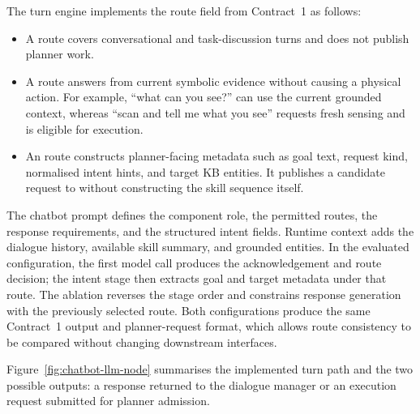 The turn engine implements the route field from Contract~1 as follows:
\begin{itemize}
  \item A  route covers conversational and task-discussion turns and does not publish planner work.
  \item A  route answers from current symbolic evidence without causing a physical action. For example, ``what can you see?'' can use the current grounded context, whereas ``scan and tell me what you see'' requests fresh sensing and is eligible for execution.
  \item An  route constructs planner-facing metadata such as goal text, request kind, normalised intent hints, and target KB entities. It publishes a candidate request to  without constructing the skill sequence itself.
\end{itemize}

The chatbot prompt defines the component role, the permitted routes, the response requirements, and the structured intent fields. Runtime context adds the dialogue history, available skill summary, and grounded entities. In the evaluated  configuration, the first model call produces the acknowledgement and route decision; the intent stage then extracts goal and target metadata under that route. The  ablation reverses the stage order and constrains response generation with the previously selected route. Both configurations produce the same Contract~1 output and planner-request format, which allows route consistency to be compared without changing downstream interfaces.

Figure~\ref{fig:chatbot-llm-node} summarises the implemented turn path and the two possible outputs: a response returned to the dialogue manager or an execution request submitted for planner admission.

